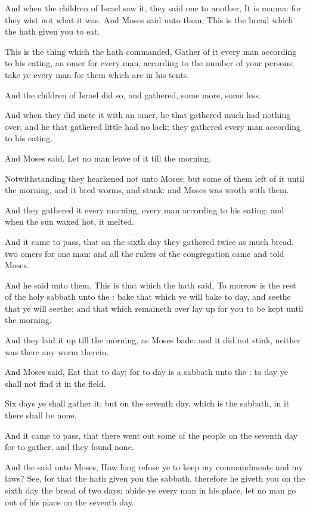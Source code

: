 \verse And when the children of Israel saw it, they said one to another, It is manna: for they wist not what it was. And Moses said unto them, This is the bread which the \LORD hath given you to eat.

\verse This is the thing which the \LORD hath commanded, Gather of it every man according to his eating, an omer for every man, according to the number of your persons; take ye every man for them which are in his tents.

\verse And the children of Israel did so, and gathered, some more, some less.

\verse And when they did mete it with an omer, he that gathered much had nothing over, and he that gathered little had no lack; they gathered every man according to his eating.

\verse And Moses said, Let no man leave of it till the morning.

\verse Notwithstanding they hearkened not unto Moses; but some of them left of it until the morning, and it bred worms, and stank: and Moses was wroth with them.

\verse And they gathered it every morning, every man according to his eating: and when the sun waxed hot, it melted.

\verse And it came to pass, that on the sixth day they gathered twice as much bread, two omers for one man: and all the rulers of the congregation came and told Moses.

\verse And he said unto them, This is that which the \LORD hath said, To morrow is the rest of the holy sabbath unto the \LORD: bake that which ye will bake to day, and seethe that ye will seethe; and that which remaineth over lay up for you to be kept until the morning.

\verse And they laid it up till the morning, as Moses bade: and it did not stink, neither was there any worm therein.

\verse And Moses said, Eat that to day; for to day is a sabbath unto the \LORD: to day ye shall not find it in the field.

\verse Six days ye shall gather it; but on the seventh day, which is the sabbath, in it there shall be none.

\verse And it came to pass, that there went out some of the people on the seventh day for to gather, and they found none.

\verse And the \LORD said unto Moses, How long refuse ye to keep my commandments and my laws?  \verse See, for that the \LORD hath given you the sabbath, therefore he giveth you on the sixth day the bread of two days; abide ye every man in his place, let no man go out of his place on the seventh day.

